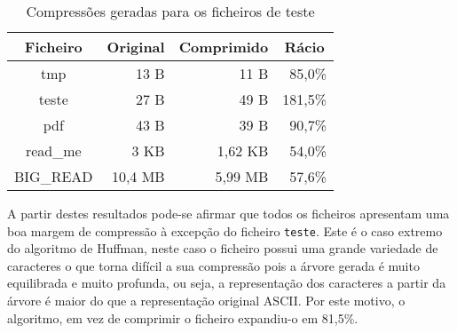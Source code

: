   \begin{table}[H]
    \centering
    \caption{Compressões geradas para os ficheiros de teste}
    \begin{tabular}{|c|r|r|r|}
        \hline
        \textbf{Ficheiro}                                 &
        \multicolumn{1}{c|}{\textbf{Original}}            &
        \multicolumn{1}{c|}{\textbf{Comprimido}}          &
        \multicolumn{1}{c|}{\textbf{Rácio}}\\ \hline \hline
        tmp        &  13  B     &  11 B             & 85,0\%     \\ \hline
        teste      &  27  B     &  49 B             & 181,5\%    \\ \hline
        pdf        &  43  B     &  39 B             & 90,7\%     \\ \hline
        read\_me   &  3  KB     &  1,62 KB          & 54,0\%     \\ \hline
        BIG\_READ  &  10,4 MB   &  5,99 MB          & 57,6\%     \\
        \hline
    \end{tabular}
    \label{tab:compression}
  \end{table}

  A partir destes resultados pode-se afirmar que todos os ficheiros apresentam uma boa margem de compressão à excepção do ficheiro \texttt{teste}. Este é o caso extremo do algoritmo de Huffman, neste caso o ficheiro possui uma grande variedade de caracteres o que torna difícil a sua compressão pois a árvore gerada é muito equilibrada e muito profunda, ou seja, a representação dos caracteres a partir da árvore é maior do que a representação original ASCII. Por este motivo, o algoritmo, em vez de comprimir o ficheiro expandiu-o em 81,5\%.
